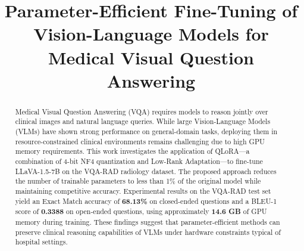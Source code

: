 \title{Parameter-Efficient Fine-Tuning of Vision-Language Models for Medical Visual Question Answering}

\author{
}

\maketitle

\begin{abstract}
Medical Visual Question Answering (VQA) requires models to reason jointly over clinical images and natural language queries. While large Vision-Language Models (VLMs) have shown strong performance on general-domain tasks, deploying them in resource-constrained clinical environments remains challenging due to high GPU memory requirements. This work investigates the application of QLoRA---a combination of 4-bit NF4 quantization and Low-Rank Adaptation---to fine-tune LLaVA-1.5-7B on the VQA-RAD radiology dataset. The proposed approach reduces the number of trainable parameters to less than 1\% of the original model while maintaining competitive accuracy. Experimental results on the VQA-RAD test set yield an Exact Match accuracy of \textbf{68.13\%} on closed-ended questions and a BLEU-1 score of \textbf{0.3388} on open-ended questions, using approximately \textbf{14.6 GB} of GPU memory during training. These findings suggest that parameter-efficient methods can preserve clinical reasoning capabilities of VLMs under hardware constraints typical of hospital settings.
\end{abstract}
